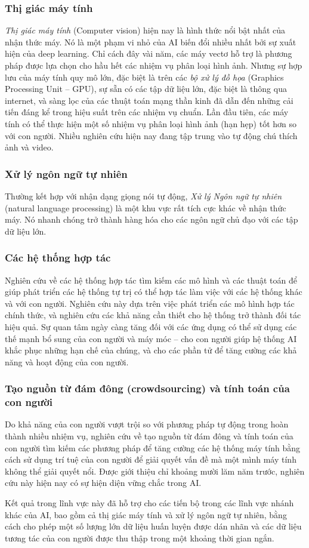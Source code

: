 \subsubsection{Thị giác máy tính}
\textit{Thị giác máy tính} (Computer vision) hiện nay là hình thức nổi bật nhất của nhận thức máy. Nó là một phạm vi nhỏ của AI biến đổi nhiều nhất bởi sự xuất hiện của deep learning. Chỉ cách đây vài năm, các máy vectơ hỗ trợ là phương pháp được lựa chọn cho hầu hết các nhiệm vụ phân loại hình ảnh. Nhưng sự hợp lưu của máy tính quy mô lớn, đặc biệt là trên các \textit{bộ xử lý đồ họa} (Graphics Processing Unit – GPU), sự sẵn có các tập dữ liệu lớn, đặc biệt là thông qua internet, và sàng lọc của các thuật toán mạng thần kinh đã dẫn đến những cải tiến đáng kể trong hiệu suất trên các nhiệm vụ chuẩn. Lần đầu tiên, các máy tính có thể thực hiện một số nhiệm vụ phân loại hình ảnh (hạn hẹp) tốt hơn so với con người. Nhiều nghiên cứu hiện nay đang tập trung vào tự động chú thích ảnh và video.
\subsubsection{Xử lý ngôn ngữ tự nhiên}
Thường kết hợp với nhận dạng giọng nói tự động, \textit{Xử lý Ngôn ngữ tự nhiên} (natural language processing) là một khu vực rất tích cực khác về nhận thức máy. Nó nhanh chóng trở thành hàng hóa cho các ngôn ngữ chủ đạo với các tập dữ liệu lớn.
\subsubsection{Các hệ thống hợp tác}
Nghiên cứu về các hệ thống hợp tác tìm kiếm các mô hình và các thuật toán để giúp phát triển các hệ thống tự trị có thể hợp tác làm việc với các hệ thống khác và với con người. Nghiên cứu này dựa trên việc phát triển các mô hình hợp tác chính thức, và nghiên cứu các khả năng cần thiết cho hệ thống trở thành đối tác hiệu quả. Sự quan tâm ngày càng tăng đối với các ứng dụng có thể sử dụng các thế mạnh bổ sung của con người và máy móc – cho con người giúp hệ thống AI khắc phục những hạn chế của chúng, và cho các phần tử để tăng cường các khả năng và hoạt động của con người.
\subsubsection{Tạo nguồn từ đám đông (crowdsourcing) và tính toán của con người}
Do khả năng của con người vượt trội so với phương pháp tự động trong hoàn thành nhiều nhiệm vụ, nghiên cứu về tạo nguồn từ đám đông và tính toán của con người tìm kiếm các phương pháp để tăng cường các hệ thống máy tính bằng cách sử dụng trí tuệ của con người để giải quyết vấn đề mà một mình máy tính không thể giải quyết nổi. Được giới thiệu chỉ khoảng mười lăm năm trước, nghiên cứu này hiện nay có sự hiện diện vững chắc trong AI.\par
Kết quả trong lĩnh vực này đã hỗ trợ cho các tiến bộ trong các lĩnh vực nhánh khác của AI, bao gồm cả thị giác máy tính và xử lý ngôn ngữ tự nhiên, bằng cách cho phép một số lượng lớn dữ liệu huấn luyện được dán nhãn và các dữ liệu tương tác của con người được thu thập trong một khoảng thời gian ngắn.
